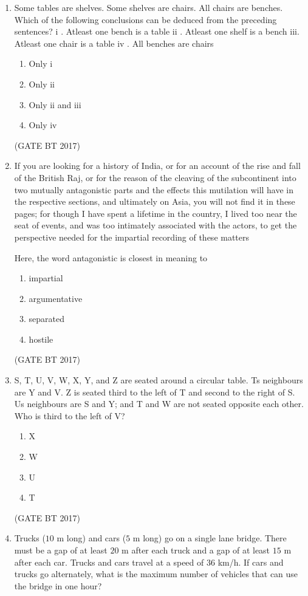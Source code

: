 \documentclass[journal,12pt,onecolumn]{IEEEtran}
\theoremstyle{remark}
\begin{document}
\begin{enumerate}
\item
Some tables are shelves. Some shelves are chairs. All chairs are benches. Which of the following conclusions can be deduced from the preceding sentences?
i  . Atleast one bench is a table
ii . Atleast one shelf is a bench
iii. Atleast one chair is a table
iv . All benches are chairs
\begin{enumerate}
  \item Only i
  \item Only ii
  \item Only ii and iii
  \item Only iv
\end{enumerate}
\hfill (GATE BT 2017)

\item
If you are looking for a history of India, or for an account of the rise and fall of the British Raj, or for the reason of the cleaving of the subcontinent into two mutually antagonistic parts and the effects this mutilation will have in the respective sections, and ultimately on Asia, you will not find it in these pages; for though I have spent a lifetime in the country, I lived too near the seat of events, and was too intimately associated with the actors, to get the perspective needed for the impartial recording of these matters

Here, the word antagonistic is closest in meaning to

\begin{enumerate}
  \item impartial
  \item argumentative
  \item separated
  \item hostile
\end{enumerate}
\hfill (GATE BT 2017)

\item
S, T, U, V, W, X, Y, and Z are seated around a circular table. Ts neighbours are Y and V. Z is seated third to the left of T and second to the right of S. Us neighbours are S and Y; and T and W are not seated opposite each other. Who is third to the left of V?

\begin{enumerate}
  \item X
  \item W
  \item U
  \item T
\end{enumerate}
\hfill (GATE BT 2017)

\item Trucks ($10$ m long) and cars ($5$ m long) go on a single lane bridge. There must be a gap of at least $20$ m after each truck and a gap of at least $15$ m after each car. Trucks and cars travel at a speed of $36$ km/h. If cars and trucks go alternately, what is the maximum number of vehicles that can use the bridge in one hour?


\end{enumerate}
\end{document}
